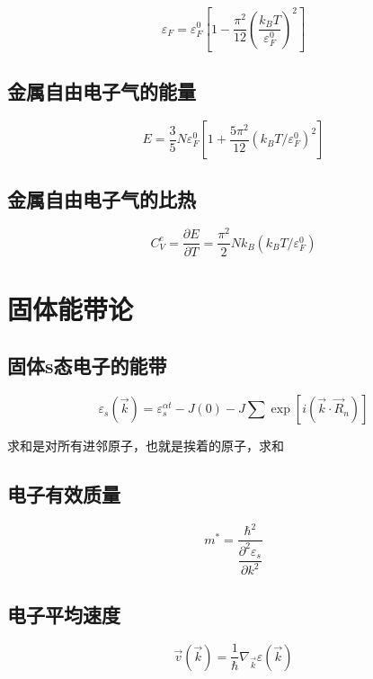 \documentclass{article}
\begin{document}
\begin{multicols}{2}
\begin{equation*}
  \varepsilon_F = \varepsilon_F^0 \left[ 1 - \dfrac{\pi^2}{12} \left( \dfrac{k_B T}{\varepsilon_F^0} \right)^2 \right]
\end{equation*}

\subsection{金属自由电子气的能量}

\begin{equation*}
  E = \dfrac{3}{5} N \varepsilon_F^0 \left[ 1 + \dfrac{5\pi^2}{12} \left( k_B T / \varepsilon_F^0 \right)^2 \right]
\end{equation*}

\subsection{金属自由电子气的比热}

\begin{equation*}
  C_V^e = \dfrac{\partial E}{\partial T} = \dfrac{\pi^2}{2} Nk_B \left( k_BT / \varepsilon_F^0 \right)
\end{equation*}

\section{固体能带论}

\subsection{固体s态电子的能带}

\begin{equation*}
  \varepsilon_s \left( \vec{k} \right) = \varepsilon_s^{\alpha t} - J \left( 0 \right) - J \sum \exp \left[ i \left( \vec{k} \cdot \vec{R}_n \right) \right]
\end{equation*}

求和是对所有进邻原子，也就是挨着的原子，求和

\subsection{电子有效质量}

\begin{equation*}
  m^{*} = \dfrac{\hbar^2}{\dfrac{\partial^2 \varepsilon_s}{\partial k^2}}
\end{equation*}

\subsection{电子平均速度}

\begin{equation*}
  \vec{v} \left( \vec{k} \right) = \dfrac{1}{\hbar} \nabla_{\vec{k}} \varepsilon \left( \vec{k} \right)
\end{equation*}

\end{multicols}
\end{document}
